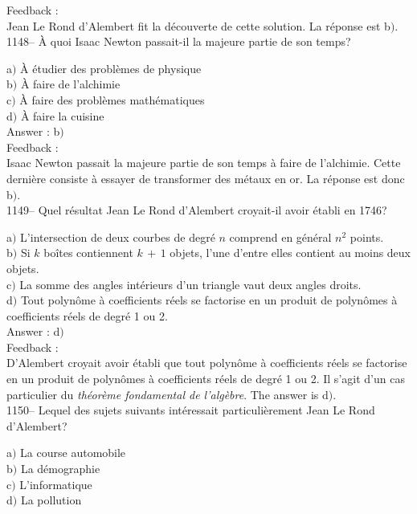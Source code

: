 ﻿\documentclass[letterpaper, 12pt]{article}
\begin{document}
Feedback : \\
Jean Le Rond d'Alembert fit la d\'ecouverte de cette solution. La r\'eponse
est b$)$.\\

1148-- \`A quoi Isaac Newton passait-il la majeure partie de son
temps?

a$)$ \`A \'etudier des probl\`emes de physique \\
b$)$ \`A faire de l'alchimie \\
c$)$ \`A faire des probl\`emes math\'ematiques \\
d$)$ \`A faire la cuisine  \\

Answer : b$)$\\

Feedback : \\
Isaac Newton passait la majeure partie de son temps \`a faire de l'alchimie.
Cette derni\`ere consiste \`a essayer de transformer des m\'etaux en or. La
r\'eponse est donc b$)$.\\

1149-- Quel r\'esultat Jean Le Rond d'Alembert croyait-il avoir
\'etabli en 1746?

a$)$ L'intersection de deux courbes de degr\'e $n$ comprend en g\'en\'eral
$n^2$ points. \\
b$)$ Si $k$ bo\^ites contiennent $k\,+\,1$ objets, l'une d'entre elles
contient au moins deux objets. \\
c$)$ La somme des angles int\'erieurs d'un triangle vaut deux angles droits.
\\
d$)$ Tout polyn\^ome \`a coefficients r\'eels se factorise en un produit de
polyn\^omes \`a coefficients r\'eels de degr\'e 1 ou 2.\\

Answer : d$)$\\

Feedback : \\
D'Alembert croyait avoir \'etabli que tout polyn\^ome \`a
coefficients r\'eels se factorise en un produit de polyn\^omes \`a
coefficients r\'eels de degr\'e 1 ou 2. Il s'agit d'un cas
particulier du {\sl th\'eor\`eme fondamental de l'alg\`ebre}.
The answer is d$)$.\\

1150-- Lequel des sujets suivants int\'eressait particuli\`erement
Jean Le Rond d'Alembert?

a$)$ La course automobile \\
b$)$ La d\'emographie \\
c$)$ L'informatique  \\
d$)$ La pollution \\
\end{document}
